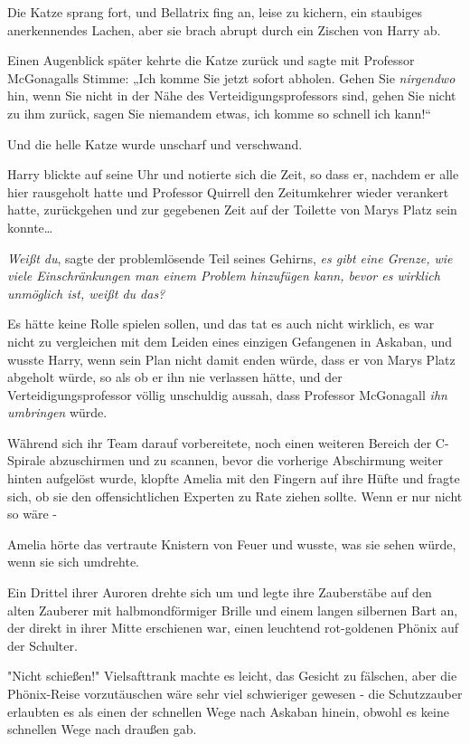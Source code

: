 {Die Katze sprang fort, und Bellatrix fing an, leise zu kichern, ein staubiges anerkennendes Lachen, aber sie brach abrupt durch ein Zischen von Harry ab.

Einen Augenblick später kehrte die Katze zurück und sagte mit Professor McGonagalls Stimme: „Ich komme Sie jetzt sofort abholen. Gehen Sie \emph{nirgendwo} hin, wenn Sie nicht in der Nähe des Verteidigungsprofessors sind, gehen Sie nicht zu ihm zurück, sagen Sie niemandem etwas, ich komme so schnell ich kann!“

Und die helle Katze wurde unscharf und verschwand.

Harry blickte auf seine Uhr und notierte sich die Zeit, so dass er, nachdem er alle hier rausgeholt hatte und Professor Quirrell den Zeitumkehrer wieder verankert hatte, zurückgehen und zur gegebenen Zeit auf der Toilette von Marys Platz sein konnte…

\emph{Weißt du}, sagte der problemlösende Teil seines Gehirns, \emph{es gibt eine Grenze, wie viele Einschränkungen man einem Problem hinzufügen kann, bevor es wirklich unmöglich ist, weißt du das?}

Es hätte keine Rolle spielen sollen, und das tat es auch nicht wirklich, es war nicht zu vergleichen mit dem Leiden eines einzigen Gefangenen in Askaban, und wusste Harry, wenn sein Plan nicht damit enden würde, dass er von Marys Platz abgeholt würde, so als ob er ihn nie verlassen hätte, und der Verteidigungsprofessor völlig unschuldig aussah, dass Professor McGonagall \emph{ihn umbringen} würde.

Während sich ihr Team darauf vorbereitete, noch einen weiteren Bereich der C-Spirale abzuschirmen und zu scannen, bevor die vorherige Abschirmung weiter hinten aufgelöst wurde, klopfte Amelia mit den Fingern auf ihre Hüfte und fragte sich, ob sie den offensichtlichen Experten zu Rate ziehen sollte. Wenn er nur nicht so wäre -

Amelia hörte das vertraute Knistern von Feuer und wusste, was sie sehen würde, wenn sie sich umdrehte.

Ein Drittel ihrer Auroren drehte sich um und legte ihre Zauberstäbe auf den alten Zauberer mit halbmondförmiger Brille und einem langen silbernen Bart an, der direkt in ihrer Mitte erschienen war, einen leuchtend rot-goldenen Phönix auf der Schulter.

"Nicht schießen!" Vielsafttrank machte es leicht, das Gesicht zu fälschen, aber die Phönix-Reise vorzutäuschen wäre sehr viel schwieriger gewesen - die Schutzzauber erlaubten es als einen der schnellen Wege nach Askaban hinein, obwohl es keine schnellen Wege nach draußen gab.

}
